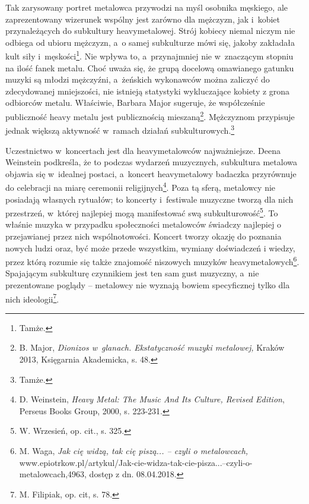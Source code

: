 \documentclass[12pt, a4paper, titlepage]{report}
\begin{document}
Tak zarysowany portret metalowca przywodzi na myśl osobnika męskiego,  ale zaprezentowany wizerunek wspólny jest zarówno dla mężczyzn, jak i~kobiet przynależących do subkultury heavymetalowej. Strój kobiecy niemal niczym nie odbiega od ubioru mężczyzn, a~o samej subkulturze mówi się, jakoby zakładała kult siły i~męskości\footnote{Tamże.}. Nie wpływa to, a~przynajmniej nie w~znaczącym stopniu na ilość fanek metalu. Choć uważa się, że grupą docelową omawianego gatunku muzyki są młodzi mężczyźni, a~żeńskich wykonawców można zaliczyć do zdecydowanej mniejszości, nie istnieją statystyki wykluczające kobiety z grona odbiorców metalu. Właściwie, Barbara Major sugeruje, że współcześnie publiczność heavy metalu jest publicznością mieszaną\footnote{B. Major, \textit{Dionizos w~glanach. Ekstatyczność muzyki metalowej,} Kraków 2013, Księgarnia Akademicka, s. 48.}. Mężczyznom przypisuje jednak większą aktywność w~ramach działań subkulturowych.\footnote{Tamże.}


Uczestnictwo w~koncertach jest dla heavymetalowców najważniejsze. Deena Weinstein podkreśla, że to podczas wydarzeń muzycznych, subkultura metalowa objawia się w~idealnej postaci, a~koncert heavymetalowy badaczka przyrównuje do celebracji na miarę ceremonii religijnych\footnote{D. Weinstein, \textit{Heavy Metal: The Music And Its Culture, Revised Edition}, Perseus Books Group, 2000, s. 223-231.}. Poza tą sferą, metalowcy nie posiadają własnych rytuałów; to koncerty i~festiwale muzyczne tworzą dla nich przestrzeń, w~której najlepiej mogą manifestować swą subkulturowość\footnote{W. Wrzesień, op. cit., s. 325.}. To właśnie muzyka w przypadku społeczności metalowców świadczy najlepiej o przejawianej przez nich wspólnotowości. Koncert tworzy okazję do poznania nowych ludzi oraz, być może przede wszystkim, wymiany doświadczeń i wiedzy, przez którą rozumie się także znajomość niszowych muzyków heavymetalowych\footnote{M. Waga, \textit{Jak cię widzą, tak cię piszą... -- czyli o metalowcach,} www.epiotrkow.pl/\break artykul/Jak-cie-widza-tak-cie-pisza...--czyli-o-metalowcach,4963, dostęp z dn. 08.04.2018.}. Spajającym subkulturę czynnikiem jest ten sam gust muzyczny, a~nie prezentowane poglądy -- metalowcy nie wyznają bowiem specyficznej tylko dla nich ideologii\footnote{M. Filipiak, op. cit, s. 78.}.
\end{document}
